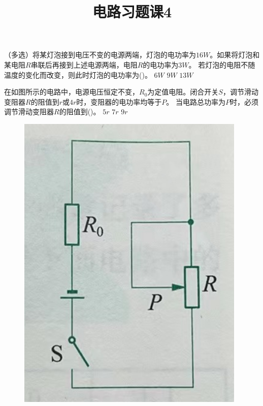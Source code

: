 \documentclass[a4paper,cs4size]{BHCexam}
\title{电路习题课4}
\begin{document}
\maketitle
\begin{groups}

    \begin{questions}[]

        \question[5] （多选）将某灯泡接到电压不变的电源两端，灯泡的电功率为$16W$。如果将灯泡和某电阻$R$串联后再接到上述电源两端，电阻$R$的电功率为$3W$。
        若灯泡的电阻不随温度的变化而改变，则此时灯泡的电功率为(\quad\quad\quad)。
        {$6W$}
        {$9W$}
        {$13W$}
        \vspace{3.5cm}


        \question[5] 在如图所示的电路中，电源电压恒定不变，$R_0$为定值电阻。闭合开关$S$，调节滑动变阻器$R$的阻值到$r$或$4r$时，变阻器的电功率均等于$P$。
        当电路总功率为$P$时，必须调节滑动变阻器$R$的阻值到(\quad\quad\quad)。
        {$5r$}
        {$7r$}
        {$9r$}
        \begin{figure}[htb]
            \flushright
            \includegraphics [scale=0.4,trim=0 0 0 0]{./image/physics_circuit4_1.png}
            \label{fig:fig_circuit4_1}
        \end{figure}
        \vspace{1.5cm}


\end{questions}
\end{groups}
\end{document}
